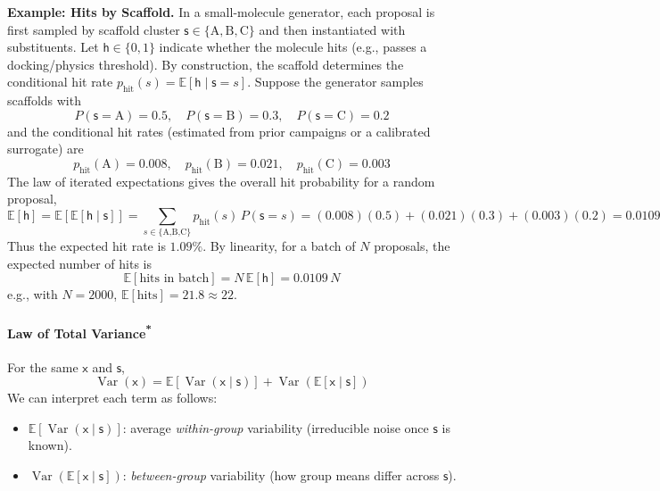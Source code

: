 \begin{exampleBox}
    \textbf{Example: Hits by Scaffold.}
    In a small-molecule generator, each proposal is first sampled by scaffold cluster $\mathsf{s}\in\{\text{A},\text{B},\text{C}\}$ and then instantiated with substituents. Let $\mathsf{h}\in\{0,1\}$ indicate whether the molecule hits (e.g., passes a docking/physics threshold). By construction, the scaffold determines the conditional hit rate $p_{\text{hit}}(s)=\mathbb{E}[\mathsf{h}\mid \mathsf{s}=s]$. Suppose the generator samples scaffolds with
    \begin{equation}
        P(\mathsf{s}=\text{A})=0.5,\quad P(\mathsf{s}=\text{B})=0.3,\quad P(\mathsf{s}=\text{C})=0.2
    \end{equation}
    and the conditional hit rates (estimated from prior campaigns or a calibrated surrogate) are
    \begin{equation}
        p_{\text{hit}}(\text{A})=0.008,\quad p_{\text{hit}}(\text{B})=0.021,\quad p_{\text{hit}}(\text{C})=0.003
    \end{equation}
    The law of iterated expectations gives the overall hit probability for a random proposal,
    \begin{equation}
        \mathbb{E}[\mathsf{h}]
        = \mathbb{E}\left[\mathbb{E}[\mathsf{h}\mid \mathsf{s}]\right]
        = \sum_{s\in\{\text{A,B,C}\}} p_{\text{hit}}(s)\,P(\mathsf{s}=s)
        = (0.008)(0.5)+(0.021)(0.3)+(0.003)(0.2)=0.0109
    \end{equation}
    Thus the expected hit rate is $1.09\%$. By linearity, for a batch of $N$ proposals, the expected number of hits is
    \begin{equation}
        \mathbb{E}[\text{hits in batch}] = N\,\mathbb{E}[\mathsf{h}] = 0.0109 \,N
    \end{equation}
    e.g., with $N=2000$, $\mathbb{E}[\text{hits}]=21.8\approx 22$.
\end{exampleBox}
  

\paragraph*{\texorpdfstring{Law of Total Variance\textsuperscript{*}}{Law of Total Variance}}
For the same $\mathsf{x}$ and $\mathsf{s}$,
\begin{equation}
  \operatorname{Var}(\mathsf{x})
  =
  \mathbb{E}\left[\operatorname{Var}(\mathsf{x}\mid \mathsf{s})\right]
  +
  \operatorname{Var}\left(\mathbb{E}[\mathsf{x}\mid \mathsf{s}]\right)
  \label{eq:ltv}
\end{equation}
We can interpret each term as follows:
\begin{itemize}
  \item $\mathbb{E}[\operatorname{Var}(\mathsf{x}\mid \mathsf{s})]$: average \emph{within-group} variability (irreducible noise once $\mathsf{s}$ is known).
  \item $\operatorname{Var}(\mathbb{E}[\mathsf{x}\mid \mathsf{s}])$: \emph{between-group} variability (how group means differ across $\mathsf{s}$).
\end{itemize}


